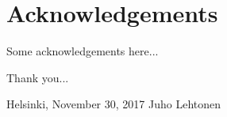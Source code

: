 \documentclass[12pt,a4paper,oneside,pdftex]{report}
\newcommand{\DATE}{November 30, 2017}
\newcommand{\AUTHOR}{Juho Lehtonen}
\begin{document}
{%


%

}





\chapter*{Acknowledgements}

Some acknowledgements here...

Thank you...
\vskip 10mm

\noindent Helsinki, \DATE
\vskip 5mm
\noindent\AUTHOR

\cleardoublepage
% 
\end{document}
